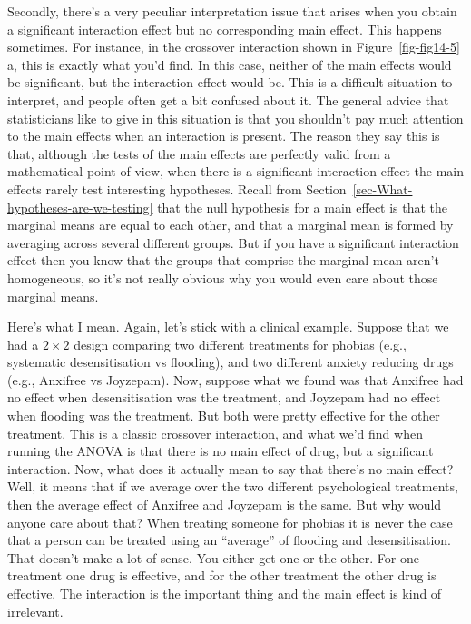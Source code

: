 \documentclass[
  a4paper,
]{book}
\begin{document}
Secondly, there's a very peculiar interpretation issue that arises when
you obtain a significant interaction effect but no corresponding main
effect. This happens sometimes. For instance, in the crossover
interaction shown in Figure~\ref{fig-fig14-5} a, this is exactly what
you'd find. In this case, neither of the main effects would be
significant, but the interaction effect would be. This is a difficult
situation to interpret, and people often get a bit confused about it.
The general advice that statisticians like to give in this situation is
that you shouldn't pay much attention to the main effects when an
interaction is present. The reason they say this is that, although the
tests of the main effects are perfectly valid from a mathematical point
of view, when there is a significant interaction effect the main effects
rarely test interesting hypotheses. Recall from
Section~\ref{sec-What-hypotheses-are-we-testing} that the null
hypothesis for a main effect is that the marginal means are equal to
each other, and that a marginal mean is formed by averaging across
several different groups. But if you have a significant interaction
effect then you know that the groups that comprise the marginal mean
aren't homogeneous, so it's not really obvious why you would even care
about those marginal means.

Here's what I mean. Again, let's stick with a clinical example. Suppose
that we had a \(2 \times 2\) design comparing two different treatments
for phobias (e.g., systematic desensitisation vs flooding), and two
different anxiety reducing drugs (e.g., Anxifree vs Joyzepam). Now,
suppose what we found was that Anxifree had no effect when
desensitisation was the treatment, and Joyzepam had no effect when
flooding was the treatment. But both were pretty effective for the other
treatment. This is a classic crossover interaction, and what we'd find
when running the ANOVA is that there is no main effect of drug, but a
significant interaction. Now, what does it actually mean to say that
there's no main effect? Well, it means that if we average over the two
different psychological treatments, then the average effect of Anxifree
and Joyzepam is the same. But why would anyone care about that? When
treating someone for phobias it is never the case that a person can be
treated using an ``average'' of flooding and desensitisation. That
doesn't make a lot of sense. You either get one or the other. For one
treatment one drug is effective, and for the other treatment the other
drug is effective. The interaction is the important thing and the main
effect is kind of irrelevant.
\end{document}
